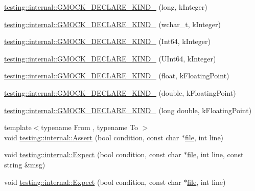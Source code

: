 \begin{DoxyCompactItemize}
\hyperlink{namespacetesting_1_1internal_a40597f856b3d94dc82e9fbbf9b027819}{testing\+::internal\+::\+G\+M\+O\+C\+K\+\_\+\+D\+E\+C\+L\+A\+R\+E\+\_\+\+K\+I\+N\+D\+\_\+} (long, k\+Integer)
\item 
\hyperlink{namespacetesting_1_1internal_af00aa2679c10ed170064e5ec5dd80e29}{testing\+::internal\+::\+G\+M\+O\+C\+K\+\_\+\+D\+E\+C\+L\+A\+R\+E\+\_\+\+K\+I\+N\+D\+\_\+} (wchar\+\_\+t, k\+Integer)
\item 
\hyperlink{namespacetesting_1_1internal_ae1d4cd9aef9a240d257364691ed3679e}{testing\+::internal\+::\+G\+M\+O\+C\+K\+\_\+\+D\+E\+C\+L\+A\+R\+E\+\_\+\+K\+I\+N\+D\+\_\+} (Int64, k\+Integer)
\item 
\hyperlink{namespacetesting_1_1internal_ae09394c3d07a5d99308fc3bbc9edc877}{testing\+::internal\+::\+G\+M\+O\+C\+K\+\_\+\+D\+E\+C\+L\+A\+R\+E\+\_\+\+K\+I\+N\+D\+\_\+} (U\+Int64, k\+Integer)
\item 
\hyperlink{namespacetesting_1_1internal_ad4ebf1b53b79ac38fbd18ccf4d63ceca}{testing\+::internal\+::\+G\+M\+O\+C\+K\+\_\+\+D\+E\+C\+L\+A\+R\+E\+\_\+\+K\+I\+N\+D\+\_\+} (float, k\+Floating\+Point)
\item 
\hyperlink{namespacetesting_1_1internal_a45748f4c08b868cb4939081769cdc7b1}{testing\+::internal\+::\+G\+M\+O\+C\+K\+\_\+\+D\+E\+C\+L\+A\+R\+E\+\_\+\+K\+I\+N\+D\+\_\+} (double, k\+Floating\+Point)
\item 
\hyperlink{namespacetesting_1_1internal_af46fdd94d8aea0da729b554de443315f}{testing\+::internal\+::\+G\+M\+O\+C\+K\+\_\+\+D\+E\+C\+L\+A\+R\+E\+\_\+\+K\+I\+N\+D\+\_\+} (long double, k\+Floating\+Point)
\item 
{\footnotesize template$<$typename From , typename To $>$ }\\void \hyperlink{namespacetesting_1_1internal_a7a259643b7f2d23ce2b757728df42c99}{testing\+::internal\+::\+Assert} (bool condition, const char $\ast$\hyperlink{_07copy_08_2_read_camera_model_8m_a151631b2fd2bb776ef06c9f440a7ed74}{file}, int line)
\item 
void \hyperlink{namespacetesting_1_1internal_ab3000fc56be000e4fa6ed7cdcfee3106}{testing\+::internal\+::\+Expect} (bool condition, const char $\ast$\hyperlink{_07copy_08_2_read_camera_model_8m_a151631b2fd2bb776ef06c9f440a7ed74}{file}, int line, const string \&msg)
\item 
void \hyperlink{namespacetesting_1_1internal_a0dfe8a755bd02aa5ea162764b61a9d97}{testing\+::internal\+::\+Expect} (bool condition, const char $\ast$\hyperlink{_07copy_08_2_read_camera_model_8m_a151631b2fd2bb776ef06c9f440a7ed74}{file}, int line)

\end{DoxyCompactItemize}
